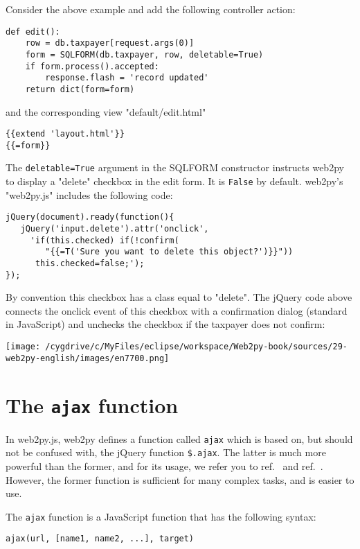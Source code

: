 \documentclass[justified,sixbynine,notoc]{tufte-book}
\def\ft{\small\tt}
\def\inxx#1{\index{#1}}
\begin{document}
\begin{fullwidth}
Consider the above example and add the following controller action:
\begin{lstlisting}
def edit():
    row = db.taxpayer[request.args(0)]
    form = SQLFORM(db.taxpayer, row, deletable=True)
    if form.process().accepted:
        response.flash = 'record updated'
    return dict(form=form)
\end{lstlisting}
\noindent and the corresponding view "default/edit.html"
\begin{lstlisting}[keywords={}]
{{extend 'layout.html'}}
{{=form}}
\end{lstlisting}

\inxx{deletable}
The {\ft deletable=True} argument in the SQLFORM constructor instructs web2py to display a "delete" checkbox in the edit form. It is {\ft False} by default.
\noindent web2py's "web2py.js" includes the following code:
\begin{lstlisting}
jQuery(document).ready(function(){
   jQuery('input.delete').attr('onclick',
     'if(this.checked) if(!confirm(
        "{{=T('Sure you want to delete this object?')}}"))
      this.checked=false;');
});
\end{lstlisting}

By convention this checkbox has a class equal to "delete". The jQuery code above connects the onclick event of this checkbox with a confirmation dialog (standard in JavaScript) and unchecks the checkbox if the taxpayer does not confirm:


\goodbreak\begin{center}\texttt{[image: /cygdrive/c/MyFiles/eclipse/workspace/Web2py-book/sources/29-web2py-english/images/en7700.png]}\end{center}


\goodbreak\section{The {\ft ajax} function}

In web2py.js, web2py defines a function called {\ft ajax} which is based on, but should not be confused with, the jQuery function {\ft \$.ajax}. The latter is much more powerful than the former, and for its usage, we refer you to ref.~\cite{jquery} and ref.~\cite{jquery-b}. However, the former function is sufficient for many complex tasks, and is easier to use.

The {\ft ajax} function is a JavaScript function that has the following syntax:
\begin{lstlisting}
ajax(url, [name1, name2, ...], target)
\end{lstlisting}


\end{fullwidth}
\end{document}
